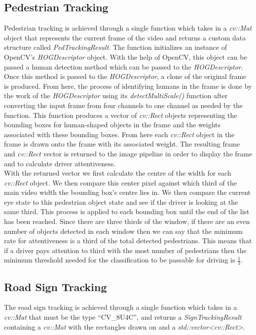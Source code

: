 \subsection{Pedestrian Tracking}
Pedestrian tracking is achieved through a single function which takes in a \emph{cv::Mat} object that represents the current frame of the video and returns a custom data structure called \emph{PedTrackingResult}. The function initializes an instance of OpenCV's \emph{HOGDescriptor} object. With the help of OpenCV, this object can be passed a human detection method which can be passed to the \emph{HOGDescriptor}. Once this method is passed to the \emph{HOGDescriptor}, a clone of the original frame is produced. From here, the process of identifying humans in the frame is done by the work of the \emph{HOGDescriptor} using its \emph{detectMultiScale()} function after converting the input frame from four channels to one channel as needed by the function. This function produces a vector of \emph{cv::Rect} objects representing the bounding boxes for human-shaped objects in the frame and the weights associated with these bounding boxes. From here each \emph{cv::Rect} object in the frame is drawn onto the frame with its associated weight. The resulting frame and \emph{cv::Rect} vector is returned to the image pipeline in order to display the frame and to calculate driver attentiveness.\\

With the returned vector we first calculate the centre of the width for each \emph{cv::Rect} object. We then compare this center pixel against which third of the main video width the bounding box's centre lies in. We then compare the current eye state to this pedestrian object state and see if the driver is looking at the same third. This process is applied to each bounding box until the end of the list has been reached. Since there are three thirds of the window, if there are an even number of objects detected in each window then we can say that the minimum rate for attentiveness is a third of the total detected pedestrians. This means that if a driver pays attention to third with the most number of pedestrians then the minimum threshold needed for the classification to be passable for driving is $\frac{1}{3}$.

\subsection{Road Sign Tracking}

The road sign tracking is achieved through a single function which takes in a \emph{cv::Mat} that must be the type ``CV\_8U4C'', and returns a \emph{SignTrackingResult} containing a \emph{cv::Mat} with the rectangles drawn on and a \emph{std::vector<cv::Rect>}.

